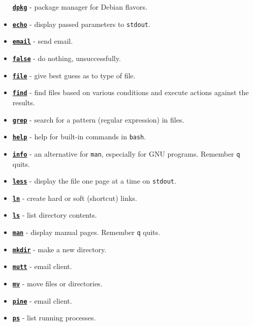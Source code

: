 \documentclass[10pt,]{book}
\numberwithin{figure}{chapter}
\begin{document}
\begin{itemize}
  \href{http://linux.die.net/man/1/dpkg}{\textbf{\texttt{dpkg}}} -
  package manager for Debian flavors.
\item
  \href{linux.die.net/man/1/echo}{\textbf{\texttt{echo}}} - display
  passed parameters to \texttt{stdout}.
\item
  \href{http://linux.die.net/man/1/email}{\textbf{\texttt{email}}} -
  send email.
\item
  \href{linux.die.net/man/1/false}{\textbf{\texttt{false}}} - do
  nothing, unsuccessfully.
\item
  \href{linux.die.net/man/1/file}{\textbf{\texttt{file}}} - give best
  guess as to type of file.
\item
  \href{http://linux.die.net/man/1/find}{\textbf{\texttt{find}}} - find
  files based on various conditions and execute actions against the
  results.
\item
  \href{linux.die.net/man/1/grep}{\textbf{\texttt{grep}}} - search for a
  pattern (regular expression) in files.
\item
  \href{linux.die.net/man/1/help}{\textbf{\texttt{help}}} - help for
  built-in commands in \texttt{bash}.
\item
  \href{http://linux.die.net/man/1/info}{\textbf{\texttt{info}}} - an
  alternative for \texttt{man}, especially for GNU programs. Remember
  \texttt{q} quits.
\item
  \href{linux.die.net/man/1/less}{\textbf{\texttt{less}}} - display the
  file one page at a time on \texttt{stdout}.
\item
  \href{linux.die.net/man/1/ln}{\textbf{\texttt{ln}}} - create hard or
  soft (shortcut) links.
\item
  \href{linux.die.net/man/1/ls}{\textbf{\texttt{ls}}} - list directory
  contents.
\item
  \href{linux.die.net/man/1/man}{\textbf{\texttt{man}}} - display manual
  pages. Remember \texttt{q} quits.
\item
  \href{linux.die.net/man/1/mkdir}{\textbf{\texttt{mkdir}}} - make a new
  directory.
\item
  \href{linux.die.net/man/1/mutt}{\textbf{\texttt{mutt}}} - email
  client.
\item
  \href{linux.die.net/man/1/mv}{\textbf{\texttt{mv}}} - move files or
  directories.
\item
  \href{linux.die.net/man/1/pine}{\textbf{\texttt{pine}}} - email
  client.
\item
  \href{linux.die.net/man/1/ps}{\textbf{\texttt{ps}}} - list running
  processes.

\end{itemize}
\end{document}
